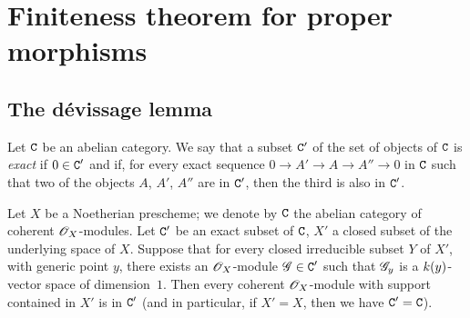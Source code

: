 \section{Finiteness theorem for proper morphisms}
\label{section:III.3}

\subsection{The d\'evissage lemma}
\label{subsection:III.3.1}

\begin{definition}[3.1.1]
\label{III.3.1.1}
Let $\mathtt{C}$ be an abelian category.
We say that a subset $\mathtt{C}'$ of the set of objects of $\mathtt{C}$ is \emph{exact} if $0\in\mathtt{C}'$ and if, for every exact sequence $0\to A'\to A\to A''\to 0$ in $\mathtt{C}$ such that two of the objects $A$, $A'$, $A''$ are in $\mathtt{C}'$, then the third is also in $\mathtt{C}'$.
\end{definition}

\begin{theorem}[3.1.2]
\label{III.3.1.2}
Let $X$ be a Noetherian prescheme; we denote by $\mathtt{C}$ the abelian category of coherent $\mathscr{O}_X$-modules.
Let $\mathtt{C}'$ be an exact subset of $\mathtt{C}$, $X'$ a closed subset of the underlying space of $X$.
Suppose that for every closed irreducible subset $Y$ of $X'$, with generic point $y$, there exists an $\mathscr{O}_X$-module $\mathscr{G}\in\mathtt{C}'$ such that $\mathscr{G}_y$ is a $k(y)$-vector space of dimension~$1$.
Then every coherent $\mathscr{O}_X$-module with support contained in $X'$ is in $\mathtt{C}'$ (and in particular, if $X'=X$, then we have $\mathtt{C}'=\mathtt{C}$).
\end{theorem}

